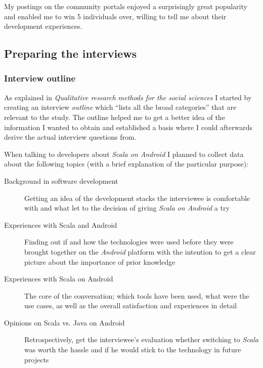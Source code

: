 My postings on the community portals enjoyed a surprisingly great popularity and enabled me to win 5 individuals over, willing to tell me about their development experiences.

\subsection{Preparing the interviews}

\subsubsection{Interview outline}

As explained in \textit{Qualitative research methods for the social sciences} I started by creating an interview \textit{outline} which \enquote{lists all the broad categories} \cite[p. 72]{berg01} that are relevant to the study. The outline helped me to get a better idea of the information I wanted to obtain and established a basis where I could afterwards derive the actual interview questions from.

When talking to developers about \textit{Scala on Android} I planned to collect data about the following topics (with a brief explanation of the particular purpose):

\begin{description}

	\item[Background in software development]\hfill

	Getting an idea of the development stacks the interviewee is comfortable with and what let to the decision of giving \textit{Scala on Android} a try

	\item[Experiences with Scala and Android]\hfill

	Finding out if and how the technologies were used before they were brought together on the \textit{Android} platform with the intention to get a clear picture about the importance of prior knowledge

	\item[Experiences with Scala on Android]\hfill

	The core of the conversation; which tools have been used, what were the use cases, as well as the overall satisfaction and experiences in detail

	\item[Opinions on Scala vs. Java on Android]\hfill

	Retrospectively, get the interviewee's evaluation whether switching to \textit{Scala} was worth the hassle and if he would stick to the technology in future projects

\end{description}

